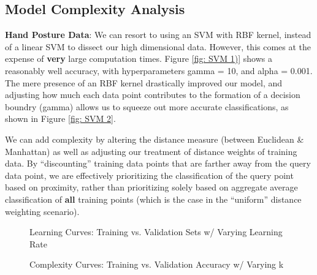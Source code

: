 \documentclass[letterpaper,12pt]{article}
\begin{document}
\subsection{Model Complexity Analysis}
\textbf{Hand Posture Data}:  We can resort to using an SVM with RBF kernel, instead of a linear SVM to dissect our high dimensional data.  However, this comes at the expense of \textbf{very} large computation times.  Figure \ref{fig: SVM 1)} shows a reasonably well accuracy, with hyperparameters gamma = 10, and alpha = 0.001.  The mere presence of an RBF kernel drastically improved our model, and adjusting how much each data point contributes to the formation of a decision boundry (gamma) allows us to squeeze out more accurate classifications, as shown in Figure \ref{fig: SVM 2}.

We can add complexity by altering the distance measure (between Euclidean \& Manhattan) as well as adjusting our treatment of distance weights of training data.  By ``discounting'' training data points that are farther away from the query data point, we are effectively prioritizing the classification of the query point based on proximity, rather than prioritizing solely based on aggregate average classification of \textbf{all} training points (which is the case in the ``uniform'' distance weighting scenario).  


\begin{figure} %
  \centering
  \hspace{8pt}%
  \caption{Learning Curves:  Training vs. Validation Sets w/ Varying Learning Rate}\label{fig:SVM Complexity Curves}
\end{figure}

\begin{figure} %
  \centering
  \hspace{8pt}%
  \caption{Complexity Curves:  Training vs. Validation Accuracy w/ Varying k }\label{fig:kNN Complexity Curves}
\end{figure}
\end{document}
